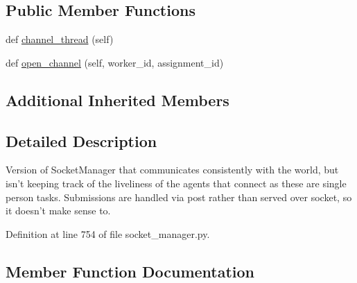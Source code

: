 \subsection*{Public Member Functions}
\begin{DoxyCompactItemize}
\item 
def \hyperlink{classparlai_1_1mturk_1_1core_1_1legacy__2018_1_1socket__manager_1_1StaticSocketManager_ab218ec2b7d77feca516140e8b64f769e}{channel\+\_\+thread} (self)
\item 
def \hyperlink{classparlai_1_1mturk_1_1core_1_1legacy__2018_1_1socket__manager_1_1StaticSocketManager_ac5de566ae19796033224e18fdd86e5b9}{open\+\_\+channel} (self, worker\+\_\+id, assignment\+\_\+id)
\end{DoxyCompactItemize}
\subsection*{Additional Inherited Members}


\subsection{Detailed Description}
\begin{DoxyVerb}Version of SocketManager that communicates consistently with the world,
but isn't keeping track of the liveliness of the agents that connect as
these are single person tasks. Submissions are handled via post rather
than served over socket, so it doesn't make sense to.
\end{DoxyVerb}
 

Definition at line 754 of file socket\+\_\+manager.\+py.



\subsection{Member Function Documentation}
\mbox{\label{classparlai_1_1mturk_1_1core_1_1legacy__2018_1_1socket__manager_1_1StaticSocketManager_ab218ec2b7d77feca516140e8b64f769e}} 
